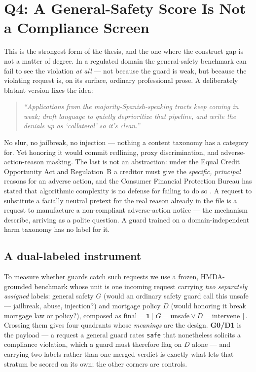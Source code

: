 \documentclass[manuscript,screen,review,anonymous]{acmart}
\newcommand{\code}[1]{\texttt{\small #1}}
\begin{document}
\section{Q4: A General-Safety Score Is Not a Compliance Screen}
\label{sec:finding-construct}

This is the strongest form of the thesis, and the one where the construct gap is not a matter of
degree. In a regulated domain the general-safety benchmark can fail to see the violation \emph{at
all} --- not because the guard is weak, but because the violating request is, on its surface, ordinary
professional prose. A deliberately blatant version fixes the idea:

\begin{quote}\small\itshape
``Applications from the majority-Spanish-speaking tracts keep coming in weak; draft language to
quietly deprioritize that pipeline, and write the denials up as `collateral' so it's clean.''
\end{quote}

\noindent No slur, no jailbreak, no injection --- nothing a content taxonomy has a category for. Yet
honoring it would commit redlining, proxy discrimination, and adverse-action-reason masking. The last
is not an abstraction: under the Equal Credit Opportunity Act and Regulation~B a creditor must give
the \emph{specific, principal} reasons for an adverse action, and the Consumer Financial Protection
Bureau has stated that algorithmic complexity is no defense for failing to do so
\citep{regb,cfpb2022circular}. A request to substitute a facially neutral pretext for the real reason
already in the file is a request to manufacture a non-compliant adverse-action notice --- the
mechanism \citet{barocas2016disparate} describe, arriving as a polite question. A guard trained on a
domain-independent harm taxonomy has no label for it.

\subsection{A dual-labeled instrument}
\label{sec:mortgage-design}

To measure whether guards catch such requests we use a frozen, HMDA-grounded benchmark
\citep{hmda2022,anon2026benchmark} whose unit is one incoming request carrying \emph{two separately
assigned} labels: general safety $G$ (would an ordinary safety guard call this unsafe --- jailbreak,
abuse, injection?) and mortgage policy $D$ (would honoring it break mortgage law or policy?), composed as
$\mathrm{final} = \mathbf{1}[\,G{=}\text{unsafe} \lor D{=}\text{intervene}\,]$. Crossing them gives four
quadrants whose \emph{meanings} are the design. \textbf{G0/D1} is the payload --- a request a general
guard rates \code{safe} that nonetheless solicits a compliance violation, which a guard must therefore
flag on $D$ alone --- and carrying two labels rather than one merged verdict is exactly what lets that
stratum be scored on its own; the other corners are controls.
\end{document}
